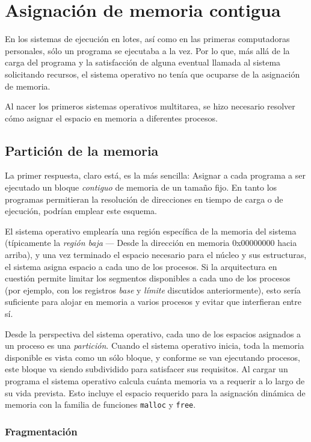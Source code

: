 \documentclass[11pt,fleqn]{book} %
\begin{document}
\section{Asignación de memoria contigua}
\label{sec-5-2}


En los sistemas de ejecución en lotes, así como en las primeras
computadoras personales, sólo un programa se ejecutaba a la vez. Por
lo que, más allá de la carga del programa y la satisfacción de alguna
eventual llamada al sistema solicitando recursos, el sistema operativo
no tenía que ocuparse de la asignación de memoria.

Al nacer los primeros sistemas operativos multitarea, se hizo
necesario resolver cómo asignar el espacio en memoria a diferentes
procesos.
\subsection{Partición de la memoria}
\label{sec-5-2-1}


La primer respuesta, claro está, es la más sencilla: Asignar
a cada programa a ser ejecutado un bloque \emph{contiguo} de memoria de un
tamaño fijo. En tanto los programas permitieran la resolución de
direcciones en tiempo de carga o de ejecución, podrían emplear este
esquema.

El sistema operativo emplearía una región específica de la memoria del
sistema (típicamente la \emph{región baja} — Desde la dirección en memoria
0x00000000 hacia arriba), y una vez terminado el espacio necesario
para el núcleo y sus estructuras, el sistema asigna espacio a cada uno
de los procesos. Si la arquitectura en cuestión permite limitar los
segmentos disponibles a cada uno de los procesos (por ejemplo, con los
registros \emph{base} y \emph{límite} discutidos anteriormente), esto sería
suficiente para alojar en memoria a varios procesos y evitar que
interfieran entre sí.

Desde la perspectiva del sistema operativo, cada uno de los espacios
asignados a un proceso es una \emph{partición}. Cuando el sistema operativo
inicia, toda la memoria disponible es vista como un sólo bloque, y
conforme se van ejecutando procesos, este bloque va siendo subdividido
para satisfacer sus requisitos. Al cargar un programa el sistema
operativo calcula cuánta memoria va a requerir a lo largo de su vida prevista.
Esto incluye el espacio requerido para la asignación dinámica de memoria
con la familia de funciones \texttt{malloc} y \texttt{free}.
\subsubsection{Fragmentación}
\label{sec-5-2-1-1}
\label{MEM_fragmentacion}
\end{document}
